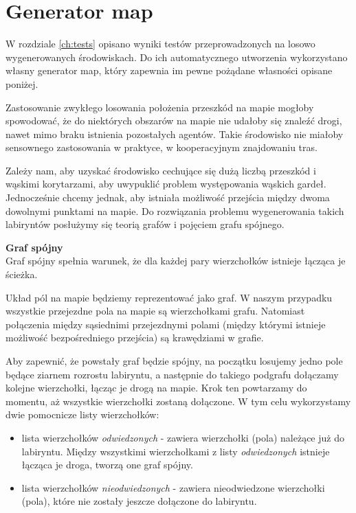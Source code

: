 \section{Generator map}

W rozdziale \ref{ch:tests} opisano wyniki testów przeprowadzonych na losowo wygenerowanych środowiskach.
Do ich automatycznego utworzenia wykorzystano własny generator map, który zapewnia im pewne pożądane własności opisane poniżej.

Zastosowanie zwykłego losowania położenia przeszkód na mapie mogłoby spowodować, że do niektórych obszarów na mapie nie udałoby się znaleźć drogi, nawet mimo braku istnienia pozostałych agentów. Takie środowisko nie miałoby sensownego zastosowania w praktyce, w kooperacyjnym znajdowaniu tras.

Zależy nam, aby uzyskać środowisko cechujące się dużą liczbą przeszkód i wąskimi korytarzami, aby uwypuklić problem występowania wąskich gardeł. Jednocześnie chcemy jednak, aby istniała możliwość przejścia między dwoma dowolnymi punktami na mapie.
Do rozwiązania problemu wygenerowania takich labiryntów posłużymy się teorią grafów i pojęciem grafu spójnego.

\begin{definition}{\bf Graf spójny\\}
	Graf spójny spełnia warunek, że dla każdej pary wierzchołków istnieje łącząca je ścieżka.
\end{definition}

Układ pól na mapie będziemy reprezentować jako graf.
W naszym przypadku wszystkie przejezdne pola na mapie są wierzchołkami grafu. Natomiast połączenia między sąsiednimi przejezdnymi polami (między którymi istnieje możliwość bezpośredniego przejścia) są krawędziami w grafie.

Aby zapewnić, że powstały graf będzie spójny, na początku losujemy jedno pole będące ziarnem rozrostu labiryntu, a następnie do takiego podgrafu dołączamy kolejne wierzchołki, łącząc je drogą na mapie. Krok ten powtarzamy do momentu, aż wszystkie wierzchołki zostaną dołączone.
W tym celu wykorzystamy dwie pomocnicze listy wierzchołków:
\begin{itemize}
	\item lista wierzchołków {\it odwiedzonych} - zawiera wierzchołki (pola) należące już do labiryntu. Między wszystkimi wierzchołkami z listy {\it odwiedzonych} istnieje łącząca je droga, tworzą one graf spójny.
	\item lista wierzchołków {\it nieodwiedzonych} - zawiera nieodwiedzone wierzchołki (pola), które nie zostały jeszcze dołączone do labiryntu.
\end{itemize}

